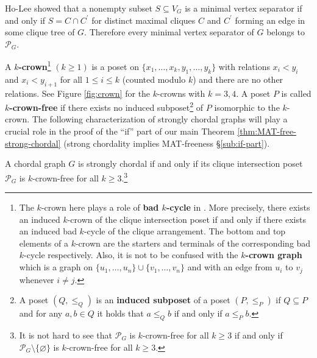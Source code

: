 \begin{remark}\label{Ho and Lee}
Ho-Lee \cite[Lemma 2.1]{ho1989counting-ipl} showed that a nonempty subset $ S \subseteq V_{G} $ is a minimal vertex separator if and only if $ S = C \cap C^{\prime} $ for distinct maximal cliques $ C $ and $ C^{\prime} $ forming an edge in some clique tree of $G$.
Therefore every minimal vertex separator of $ G $ belongs to $ \mathcal{P}_{G} $. 
\end{remark}

A \textbf{$ k $-crown}\footnote{The $ k $-crown here plays a role of \textbf{bad $ k $-cycle} in  \cite{nevries2015characterizing-dam}. 
More precisely, there exists an induced $k$-crown of the clique intersection poset if and only if there exists an induced bad $k$-cycle of the clique arrangement. The bottom and top elements of a $k$-crown are  the starters and terminals of the corresponding bad $k$-cycle respectively. Also, it is not to be confused with the \textbf{$k$-crown graph} which is a graph on $\{u_{1}, \dots, u_{n}\} \cup \{v_{1}, \dots, v_{n}\}$ and with an edge from $u_i$ to $v_j$ whenever $i\ne j$.}
$(k\ge1)$
 is a poset on $ \{x_{1}, \dots, x_{k}, y_{1}, \dots, y_{k}\} $ with relations $ x_{i} < y_{i} $ and $ x_{i} < y_{i+1} $ for all $1 \le  i \le k$ (counted modulo $k$) and there are no other relations. 
 See Figure \ref{fig:crown} for the $k$-crowns with $k=3,4$.
A poset $ P $ is called \textbf{$ k $-crown-free} if there exists no induced subposet\footnote{A poset $(Q,\le_Q)$ is an \textbf{induced subposet} of a poset $(P,\le_P)$ if $Q\subseteq P$ and for any $a,b \in Q$ it holds that $a \le_Q b$ if and only if $a \le_P b.$} of $ P $ isomorphic to the $ k $-crown.  
The following characterization of strongly chordal graphs will play a crucial role in the proof of the ``if'' part of our main Theorem \ref{thm:MAT-free-strong-chordal} (strong chordality implies MAT-freeness \S\ref{sub:if-part}).
\begin{theorem}\label{Nevries-Rosenke}
A chordal graph $ G $ is strongly chordal if and only if its clique intersection poset $ \mathcal{P}_{G} $ is $ k $-crown-free for all $ k \geq 3 $.\footnote{It is not hard to see that  $ \mathcal{P}_{G} $ is $ k $-crown-free for all $ k \geq 3 $ if and only if $ \mathcal{P}_{G}  \setminus \{\varnothing\}$  is $ k $-crown-free for all $ k \geq 3 $.}
\end{theorem}


